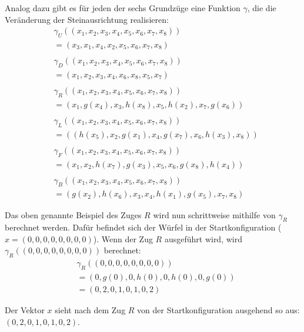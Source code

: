 \documentclass[12pt,a4paper, usenames, dvipsnames]{article}
\theoremstyle{mystyle}
\theoremstyle{definition}
\begin{document}
Analog dazu gibt es für jeden der sechs Grundzüge eine Funktion $\gamma$, die die Veränderung der Steinausrichtung realisieren:
\begin{align*}
& \gamma_U \left( (x_1, x_2, x_3, x_4, x_5, x_6, x_7, x_8  ) \right) \\ 
& =  \left( x_3, x_1, x_4, x_2, x_5, x_6, x_7, x_8 \right) \\
\\ 
& \gamma_D \left( (x_1, x_2, x_3, x_4, x_5, x_6, x_7, x_8  ) \right) \\ 
& =  \left( x_1, x_2, x_3, x_4, x_6, x_8, x_5, x_7 \right) \\
\\
& \gamma_R \left( (x_1, x_2, x_3, x_4, x_5, x_6, x_7, x_8  ) \right) \\ 
& =  \left( x_1, g(x_4), x_3, h(x_8), x_5, h(x_2), x_7, g(x_6) \right) \\ 
\\
& \gamma_L \left( (x_1, x_2, x_3, x_4, x_5, x_6, x_7, x_8  ) \right) \\ 
& =  \left( (h(x_5), x_2, g(x_1), x_4, g(x_7), x_6, h(x_3), x_8) \right) \\ 
\\
& \gamma_F \left( (x_1, x_2, x_3, x_4, x_5, x_6, x_7, x_8  ) \right) \\ 
& =  \left( x_1, x_2, h(x_7), g(x_3), x_5, x_6, g(x_8), h(x_4) \right) \\
\\
& \gamma_B \left( (x_1, x_2, x_3, x_4, x_5, x_6, x_7, x_8  ) \right) \\ 
& =  \left( g(x_2), h(x_6), x_3, x_4, h(x_1), g(x_5), x_7, x_8 \right)
\end{align*}

Das oben genannte Beispiel des Zuges $R$ wird nun schrittweise mithilfe von $\gamma_R$ berechnet werden. Dafür befindet sich der Würfel in der Startkonfiguration ($x = (0, 0, 0, 0, 0, 0, 0, 0)$). Wenn der Zug $R$ ausgeführt wird, wird $\gamma_R( (0, 0, 0, 0, 0, 0, 0, 0) )$ berechnet:
\begin{align*}
& \gamma_R( (0, 0, 0, 0, 0, 0, 0, 0) ) \\
& = (0, g(0), 0, h(0), 0, h(0), 0, g(0)) \\
& = (0, 2, 0, 1, 0, 1, 0, 2)
\end{align*}

Der Vektor $x$ sieht nach dem Zug $R$ von der Startkonfiguration ausgehend so aus: $(0, 2, 0, 1, 0, 1, 0, 2)$.

%
%
%
%
%
%
%
%
%
%
\end{document}
